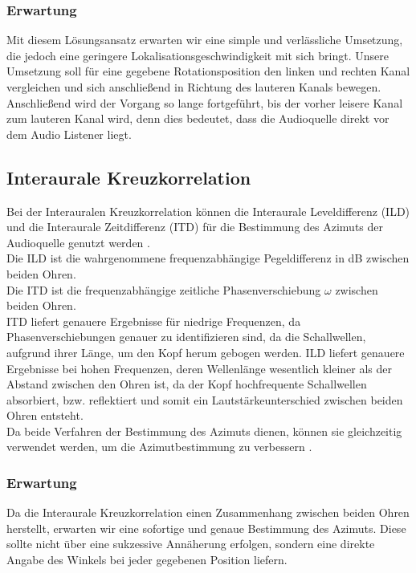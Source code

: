 \documentclass[12pt,a4paper]{article}
\begin{document}
\subsubsection{Erwartung}
Mit diesem Lösungsansatz erwarten wir eine simple und verlässliche Umsetzung, die jedoch eine geringere Lokalisationsgeschwindigkeit mit sich bringt.
Unsere Umsetzung soll für eine gegebene Rotationsposition den linken und rechten Kanal vergleichen und sich anschließend in Richtung des lauteren Kanals bewegen. Anschließend wird der Vorgang so lange fortgeführt, bis der vorher leisere Kanal zum lauteren Kanal wird, denn dies bedeutet, dass die Audioquelle direkt vor dem Audio Listener liegt.


\subsection{Interaurale Kreuzkorrelation}
Bei der Interauralen Kreuzkorrelation können die Interaurale Leveldifferenz (ILD) und die Interaurale Zeitdifferenz (ITD) für die Bestimmung des Azimuts der Audioquelle genutzt werden \cite{Fall}.\\
Die ILD ist die wahrgenommene  frequenzabhängige Pegeldifferenz in dB zwischen beiden Ohren.\\ 
Die ITD ist die frequenzabhängige zeitliche Phasenverschiebung \(\omega\) zwischen beiden Ohren.\\
ITD liefert genauere Ergebnisse für niedrige Frequenzen, da Phasenverschiebungen genauer zu identifizieren sind, da die Schallwellen, aufgrund ihrer Länge, um den Kopf herum gebogen werden. ILD liefert genauere Ergebnisse bei hohen Frequenzen, deren Wellenlänge wesentlich kleiner als der Abstand zwischen den Ohren ist, da der Kopf hochfrequente Schallwellen absorbiert, bzw. reflektiert und somit ein Lautstärkeunterschied zwischen beiden Ohren entsteht.\\
Da beide Verfahren der Bestimmung des Azimuts dienen, können sie gleichzeitig verwendet werden, um die Azimutbestimmung zu verbessern \cite{Rasp}.

\subsubsection{Erwartung}
Da die Interaurale Kreuzkorrelation einen Zusammenhang zwischen beiden Ohren herstellt, erwarten wir eine sofortige und genaue Bestimmung des Azimuts. Diese sollte nicht über eine sukzessive Annäherung erfolgen, sondern eine direkte Angabe des Winkels bei jeder gegebenen Position liefern.
\end{document}
